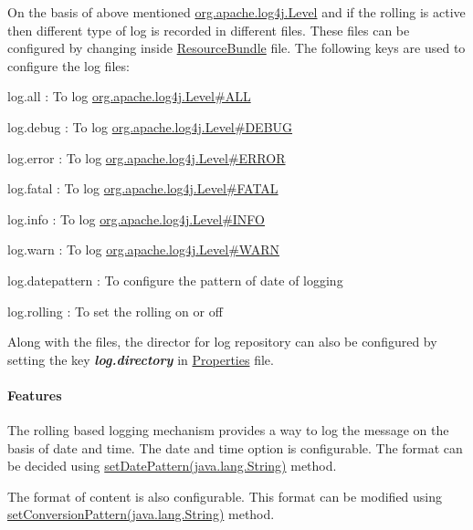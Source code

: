 On the basis of above mentioned \mbox{\hyperlink{}{org.\+apache.\+log4j.\+Level}} and if the rolling is active then different type of log is recorded in different files. These files can be configured by changing inside \mbox{\hyperlink{}{Resource\+Bundle}} file. The following keys are used to configure the log files\+: 
\begin{DoxyItemize}
\item log.\+all \+: To log \mbox{\hyperlink{}{org.\+apache.\+log4j.\+Level\#\+A\+LL}} 
\item log.\+debug \+: To log \mbox{\hyperlink{}{org.\+apache.\+log4j.\+Level\#\+D\+E\+B\+UG}} 
\item log.\+error \+: To log \mbox{\hyperlink{}{org.\+apache.\+log4j.\+Level\#\+E\+R\+R\+OR}} 
\item log.\+fatal \+: To log \mbox{\hyperlink{}{org.\+apache.\+log4j.\+Level\#\+F\+A\+T\+AL}} 
\item log.\+info \+: To log \mbox{\hyperlink{}{org.\+apache.\+log4j.\+Level\#\+I\+N\+FO}} 
\item log.\+warn \+: To log \mbox{\hyperlink{}{org.\+apache.\+log4j.\+Level\#\+W\+A\+RN}} 
\item log.\+datepattern \+: To configure the pattern of date of logging 
\item log.\+rolling \+: To set the rolling on or off 
\end{DoxyItemize}Along with the files, the director for log repository can also be configured by setting the key {\bfseries {\itshape log.\+directory}} in \mbox{\hyperlink{}{Properties}} file. \paragraph*{Features}

The rolling based logging mechanism provides a way to log the message on the basis of date and time. The date and time option is configurable. The format can be decided using \mbox{\hyperlink{}{set\+Date\+Pattern(java.\+lang.\+String)}} method. 

The format of content is also configurable. This format can be modified using \mbox{\hyperlink{}{set\+Conversion\+Pattern(java.\+lang.\+String)}} method.

